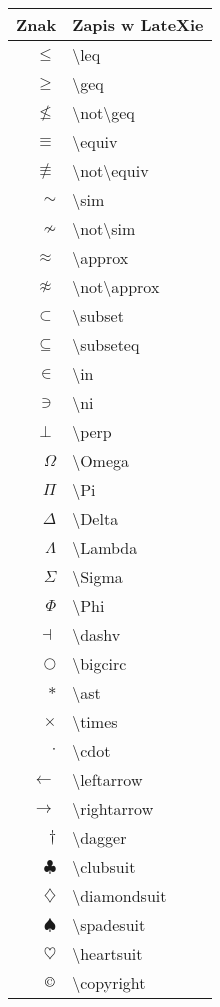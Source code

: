 \documentclass{article}
\begin{document}
\begin{center}
\begin{tabular}{|r|l|}
\hline
Znak & Zapis w LateXie \\
\hline
$\leq$ & \textbackslash leq \\
$\geq$ & \textbackslash geq \\
$\not\leq$ & \textbackslash not\textbackslash geq \\
$\equiv$ & \textbackslash equiv \\
$\not\equiv$ & \textbackslash not\textbackslash equiv \\
$\sim$ & \textbackslash sim \\
$\not\sim$ & \textbackslash not\textbackslash sim\\
$\approx$ & \textbackslash approx \\
$\not\approx$ & \textbackslash not\textbackslash approx \\
$\subset$ & \textbackslash subset \\
$\subseteq$ & \textbackslash subseteq \\
$\in$ & \textbackslash in \\
$\ni$ & \textbackslash ni \\
$\perp$ & \textbackslash perp \\
$\Omega$ & \textbackslash Omega \\
$\Pi$ & \textbackslash Pi \\
$\Delta$ & \textbackslash Delta \\
$\Lambda$ & \textbackslash Lambda \\
$\Sigma$ & \textbackslash Sigma \\
$\Phi$ & \textbackslash Phi \\
$\dashv$ & \textbackslash dashv \\
$\bigcirc$ & \textbackslash bigcirc \\
$\ast$ & \textbackslash ast \\
$\times$ & \textbackslash times\\ 
$\cdot$ & \textbackslash cdot\\
$\leftarrow$ & \textbackslash leftarrow \\
$\rightarrow$ & \textbackslash rightarrow \\
$\dagger$ & \textbackslash dagger \\
$\clubsuit$ & \textbackslash clubsuit\\
$\diamondsuit$ & \textbackslash diamondsuit \\
$\spadesuit$ & \textbackslash spadesuit\\
$\heartsuit$ & \textbackslash heartsuit \\
$\copyright$ & \textbackslash copyright \\

\hline

\end{tabular}
\end{center}
\end{document}
